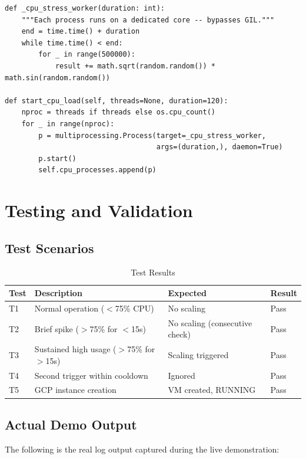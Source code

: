 \documentclass[12pt,a4paper]{article}
\begin{document}
\begin{lstlisting}[style=pythonstyle, caption={Multiprocessing load generator}]
def _cpu_stress_worker(duration: int):
    """Each process runs on a dedicated core -- bypasses GIL."""
    end = time.time() + duration
    while time.time() < end:
        for _ in range(500000):
            result += math.sqrt(random.random()) * math.sin(random.random())

def start_cpu_load(self, threads=None, duration=120):
    nproc = threads if threads else os.cpu_count()
    for _ in range(nproc):
        p = multiprocessing.Process(target=_cpu_stress_worker,
                                    args=(duration,), daemon=True)
        p.start()
        self.cpu_processes.append(p)
\end{lstlisting}

\section{Testing and Validation}

\subsection{Test Scenarios}

\begin{table}[H]
\centering
\begin{tabular}{llll}
\toprule
\textbf{Test} & \textbf{Description} & \textbf{Expected} & \textbf{Result} \\
\midrule
T1 & Normal operation ($<$75\% CPU) & No scaling & Pass \\
T2 & Brief spike ($>$75\% for $<$15s) & No scaling (consecutive check) & Pass \\
T3 & Sustained high usage ($>$75\% for $>$15s) & Scaling triggered & Pass \\
T4 & Second trigger within cooldown & Ignored & Pass \\
T5 & GCP instance creation & VM created, RUNNING & Pass \\
\bottomrule
\end{tabular}
\caption{Test Results}
\end{table}

\subsection{Actual Demo Output}

The following is the real log output captured during the live demonstration:
\end{document}
